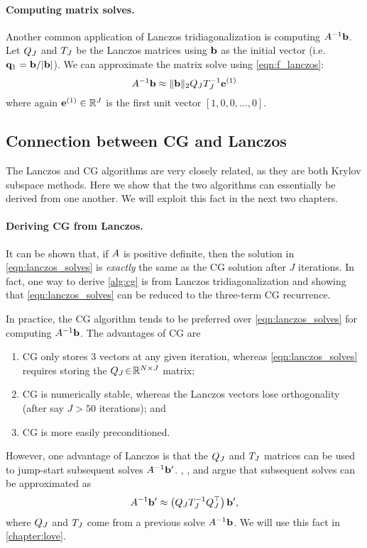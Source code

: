 \paragraph{Computing matrix solves.}
Another common application of Lanczos tridiagonalization is computing $A^{-1} \mathbf{b}$.
Let $Q_J$ and $T_J$ be the Lanczos matrices using $\mathbf{b}$ as the initial vector (i.e. $\mathbf{q}_1 = \mathbf{b} / \vert \mathbf{b} \vert$).
We can approximate the matrix solve using \cref{eqn:f_lanczos}:
%
\begin{equation}
  A^{-1} \mathbf{b} \approx \Vert \mathbf{b} \Vert_2 Q_J T_J^{-1} \mathbf{e}^{(1)}
  \label{eqn:lanczos_solves}
\end{equation}
%
where again $\mathbf{e}^{(1)} \in \mathbb{R}^J$ is the first unit vector $[1, 0, 0, \ldots, 0]$.




\subsection{Connection between CG and Lanczos}
\label{sec:cg_lanczos_connection}

The Lanczos and CG algorithms are very closely related, as they are both Krylov subspace methods.
Here we show that the two algorithms can essentially be derived from one another.
We will exploit this fact in the next two chapters.

\paragraph{Deriving CG from Lanczos.}
It can be shown that, if $A$ is positive definite, then the solution in \cref{eqn:lanczos_solves} is \emph{exactly} the same as the CG solution after $J$ iterations.
In fact, one way to derive \cref{alg:cg} is from Lanczos tridiagonalization and showing that \cref{eqn:lanczos_solves} can be reduced to the three-term CG recurrence.

In practice, the CG algorithm tends to be preferred over \cref{eqn:lanczos_solves} for computing $A^{-1} \mathbf{b}$.
The advantages of CG are
\begin{enumerate}
  \item CG only stores 3 vectors at any given iteration, whereas \cref{eqn:lanczos_solves} requires storing the $Q_J \! \in \! \mathbb{R}^{N \times J}$ matrix;
  \item CG is numerically stable, whereas the Lanczos vectors lose orthogonality (after say $J > 50$ iterations); and
  \item CG is more easily preconditioned.
\end{enumerate}
However, one advantage of Lanczos is that the $Q_J$ and $T_J$ matrices can be used to jump-start subsequent solves $A^{-1} \mathbf{b}'$.
\citet{parlett1980new}, \citet{saad1987lanczos}, and \citet{schneider2001krylov} argue that subsequent solves can be approximated as
%
\begin{equation}
  A^{-1} \mathbf{b}' \approx \left( Q_J T_J^{-1} Q_J^\top \right) \mathbf{b}',
  \label{eq:lanczos_solve}
\end{equation}
%
where $Q_J$ and $T_J$ come from a previous solve $A^{-1} \mathbf{b}$.
We will use this fact in \cref{chapter:love}.

